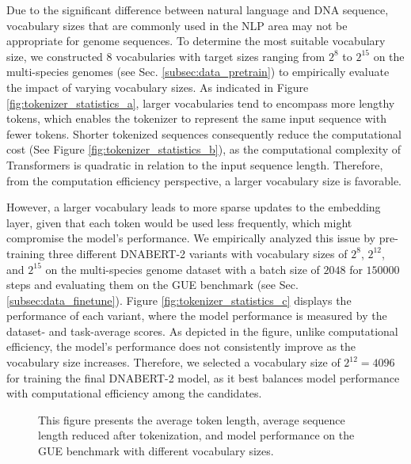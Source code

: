\documentclass{article}
\begin{document}
Due to the significant difference between natural language and DNA sequence, vocabulary sizes that are commonly used in the NLP area \citep{bert, transformer, t5, gpt4} may not be appropriate for genome sequences. To determine the most suitable vocabulary size, we constructed $8$ vocabularies with target sizes ranging from $2^8$ to $2^{15}$ on the multi-species genomes (see Sec. \ref{subsec:data_pretrain}) to empirically evaluate the impact of varying vocabulary sizes. As indicated in Figure \ref{fig:tokenizer_statistics_a}, larger vocabularies tend to encompass more lengthy tokens, which enables the tokenizer to represent the same input sequence with fewer tokens. Shorter tokenized sequences consequently reduce the computational cost (See Figure \ref{fig:tokenizer_statistics_b}), as the computational complexity of Transformers is quadratic in relation to the input sequence length. Therefore, from the computation efficiency perspective, a larger vocabulary size is favorable.

However, a larger vocabulary leads to more sparse updates to the embedding layer, given that each token would be used less frequently, which might compromise the model's performance. We empirically analyzed this issue by pre-training three different DNABERT-2 variants with vocabulary sizes of $2^8$, $2^{12}$, and $2^{15}$ on the multi-species genome dataset with a batch size of $2048$ for $150000$ steps and evaluating them on the GUE benchmark (see Sec. \ref{subsec:data_finetune}). Figure \ref{fig:tokenizer_statistics_c} displays the performance of each variant, where the model performance is measured by the dataset- and task-average scores. As depicted in the figure, unlike computational efficiency, the model's performance does not consistently improve as the vocabulary size increases. Therefore, we selected a vocabulary size of $2^{12} = 4096$ for training the final DNABERT-2 model, as it best balances model performance with computational efficiency among the candidates.



		
		 


		 


\begin{figure}\centering
    \quad
    \quad
    \caption{This figure presents the average token length, average sequence length reduced after tokenization, and model performance on the GUE benchmark with different vocabulary sizes.}\label{fig:tokenizer_statistics}\end{figure}
\end{document}
